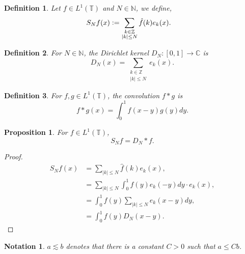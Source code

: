 \documentclass[8pt]{article}
\newtheorem{proposition}{Proposition}[section]
\newtheorem{definition}{Definition}[section]
\newtheorem{notation}{Notation}[section]
\newcommand{\ab}[1]{\vert #1 \vert}
\newcommand{\defeq}{\vcentcolon=}
\newcommand{\bN}[0]{\mathbb{N}}
\newcommand{\bZ}[0]{\mathbb{Z}}
\newcommand{\bC}[0]{\mathbb{C}}
\newcommand{\bT}[0]{\mathbb{T}}
\begin{document}
\begin{definition}
  Let $f\in L^1(\bT)$ and $N\in\bN$, we define,
  \begin{align*}
    S_Nf(x) &\defeq \sum_{\substack{k\in\bZ\\ \ab{k}\leq N}}\hat{f}(k)e_k(x).
  \end{align*}
\end{definition}
\begin{definition}
  For $N\in\bN$, the Dirichlet kernel $D_N:[0,1]\to \bC$ is 
  \begin{equation*}
    D_N(x) =  \sum_{\substack{k\in\bZ\\ \ab{k}\leq N}}e_k(x).
  \end{equation*}
\end{definition}
\begin{definition}
  For $f,g\in L^1(\bT)$, the convolution $f\ast g$ is 
  \begin{equation*}
    f\ast g(x) = \int_0^1f(x-y)g(y)dy.
  \end{equation*}
\end{definition}
\begin{proposition}
  For $f\in L^1(\bT)$, 
  \begin{equation*}
    S_Nf = D_N\ast f.
  \end{equation*}
\end{proposition}

\begin{proof}
  \begin{align*}
    S_Nf(x) &= \sum_{\ab{k}\leq N}\hat{f}(k)e_k(x),\\
    & = \sum_{\ab{k}\leq N}\int_0^1f(y)e_k(-y)dy\cdot e_k(x),\\
    & = \int_0^1f(y)\sum_{\ab{k}\leq N}e_k(x-y)dy,\\
    & = \int_0^1f(y)D_N(x-y).
  \end{align*}
\end{proof}

\begin{notation}
  $a\lesssim b$ denotes that there is a constant $C>0$ such that $a\leq Cb$.
\end{notation}
\end{document}
